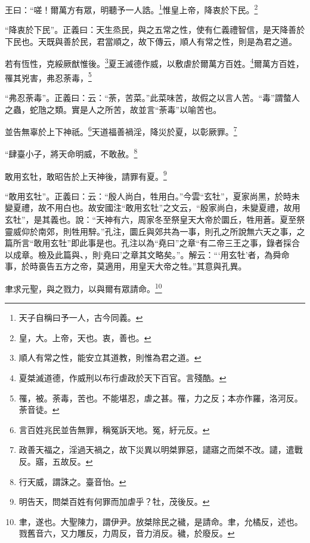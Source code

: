 王曰：“嗟！爾萬方有眾，明聽予一人誥。\footnote{天子自稱曰予一人，古今同義。}惟皇上帝，降衷於下民。\footnote{皇，大。上帝，天也。衷，善也。}

{\noindent\shu{}\fzkt “降衷於下民”。正義曰：天生烝民，與之五常之性，使有仁義禮智信，是天降善於下民也。天既與善於民，君當順之，故下傳云，順人有常之性，則是為君之道。 \par}

若有恆性，克綏厥猷惟後。\footnote{順人有常之性，能安立其道教，則惟為君之道。}夏王滅德作威，以敷虐於爾萬方百姓。\footnote{夏桀滅道德，作威刑以布行虐政於天下百官。言殘酷。}爾萬方百姓，罹其兇害，弗忍荼毒，\footnote{罹，被。荼毒，苦也。不能堪忍，虐之甚。罹，力之反；本亦作羅，洛河反。荼音徒。}

{\noindent\shu{}\fzkt “弗忍荼毒”。正義曰：云：“荼，苦菜。”此菜味苦，故假之以言人苦。“毒”謂螫人之蟲，蛇虺之類。實是人之所苦，故並言“荼毒”以喻苦也。 \par}

並告無辜於上下神祇。\footnote{言百姓兆民並告無罪，稱冤訴天地。冤，紆元反。}天道福善禍淫，降災於夏，以彰厥罪。\footnote{政善天福之，淫過天禍之，故下災異以明桀罪惡，譴寤之而桀不改。譴，遣戰反。寤，五故反。}

“肆臺小子，將天命明威，不敢赦。\footnote{行天威，謂誅之。臺音怡。}

敢用玄牡，敢昭告於上天神後，請罪有夏。\footnote{明告天，問桀百姓有何罪而加虐乎？牡，茂後反。}

{\noindent\shu{}\fzkt “敢用玄牡”。正義曰：云：“殷人尚白，牲用白。”今雲“玄牡”，夏家尚黑，於時未變夏禮，故不用白也。故安國注“敢用玄牡”之文云，“殷家尚白，未變夏禮，故用玄牡”，是其義也。說：“天神有六，周家冬至祭皇天大帝於圜丘，牲用蒼。夏至祭靈威仰於南郊，則牲用騂。”孔注，圜丘與郊共為一事，則孔之所說無六天之事，之篇所言“敢用玄牡”即此事是也。孔注以為“堯曰”之章“有二帝三王之事，錄者採合以成章。檢及此篇與、，則‘堯曰’之章其文略矣。”。解云：“‘用玄牡’者，為舜命事，於時裛告五方之帝，莫適用，用皇天大帝之牲。”其意與孔異。 \par}

聿求元聖，與之戮力，以與爾有眾請命。\footnote{聿，遂也。大聖陳力，謂伊尹。放桀除民之穢，是請命。聿，允橘反，述也。戮舊音六，又力雕反，力周反，音力消反。穢，於廢反。}

